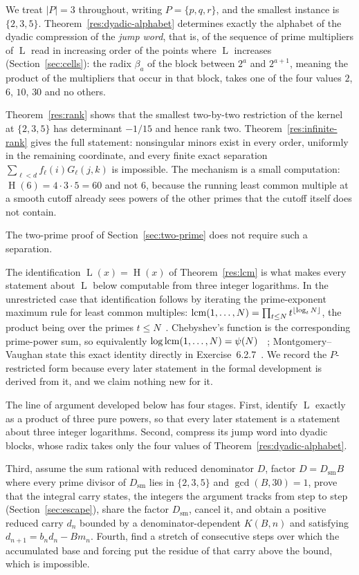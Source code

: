 \documentclass[11pt]{article}
\newcommand{\hgt}{\operatorname{H}}
\newcommand{\Lprefix}{\operatorname{L}}
\begin{document}
We treat $|P|=3$ throughout, writing $P=\{p,q,r\}$, and the smallest instance is
$\{2,3,5\}$.  Theorem~\ref{res:dyadic-alphabet} determines exactly
the alphabet of the dyadic compression of the \emph{jump word}, that is, of the
sequence of prime multipliers of $\Lprefix$ read in increasing order of the
points where $\Lprefix$ increases (Section~\ref{sec:cells}): the radix
$\beta_a$ of the block between $2^{a}$ and $2^{a+1}$, meaning the product of the
multipliers that occur in that block, takes one of the four
values $2$, $6$, $10$, $30$ and no others.

Theorem~\ref{res:rank} shows that the smallest two-by-two restriction of the
kernel at $\{2,3,5\}$ has determinant $-1/15$ and hence rank two.
Theorem~\ref{res:infinite-rank} gives the full statement: nonsingular minors
exist in every order, uniformly in the remaining coordinate, and every finite
exact separation $\sum_{\ell<d}f_\ell(i)G_\ell(j,k)$ is impossible.
The mechanism is a small computation: $\hgt(6)=4\cdot3\cdot5=60$ and not $6$,
because the running least common multiple at a smooth cutoff already sees
powers of the other primes that the cutoff itself does not contain.

The two-prime proof of Section~\ref{sec:two-prime} does not require such a
separation.

The identification $\Lprefix(x)=\hgt(x)$ of Theorem~\ref{res:lcm} is what makes
every statement about $\Lprefix$ below computable from three integer
logarithms.  In the unrestricted case that identification follows by
iterating the prime-exponent maximum rule for least common multiples:
$\operatorname{lcm}(1,\ldots,N)=\prod_{t\le N}t^{\lfloor\log_t N\rfloor}$, the product
being over the primes $t\le N$~\cite[Ex.~1.21(a), p.~22]{apostol1976}.
Chebyshev's function is the corresponding prime-power sum, so equivalently
$\log\operatorname{lcm}(1,\ldots,N)=\psi(N)$
~\cite[\S4.2, p.~75]{apostol1976}; Montgomery--Vaughan state this exact
identity directly in Exercise~6.2.7~\cite[p.~183]{montgomeryvaughan2007}.
We record the $P$-restricted form because
every later statement in the formal development is derived from it, and we
claim nothing new for it.

The line of argument developed below has four stages.  First, identify
$\Lprefix$ exactly as a product of three pure powers, so that every later
statement is a statement about three integer logarithms.  Second, compress its
jump word into dyadic blocks, whose radix takes only the four values of
Theorem~\ref{res:dyadic-alphabet}.

Third, assume the sum rational with reduced
denominator $D$, factor $D=D_{\mathrm{sm}}B$ where every prime divisor of
$D_{\mathrm{sm}}$ lies in $\{2,3,5\}$ and $\gcd(B,30)=1$, prove that the
integral carry states, the integers the argument tracks from step to step
(Section~\ref{sec:escape}), share the factor $D_{\mathrm{sm}}$, cancel it, and
obtain a positive reduced carry $d_n$ bounded by a denominator-dependent
$K(B,n)$ and satisfying
$d_{n+1}=b_nd_n-Bm_n$.  Fourth, find a stretch of consecutive steps over which
the accumulated base and forcing put the residue of that carry above the bound,
which is impossible.
\end{document}
